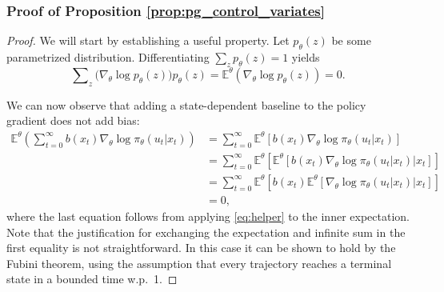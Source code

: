 \subsubsection{Proof of Proposition \ref{prop:pg_control_variates}}
\begin{proof}
We will start by establishing a useful property. 
Let $p_\theta(z)$ be some parametrized distribution. Differentiating $\sum\nolimits_{z } {{p_\theta }(z)}  = 1$  yields
\begin{equation}\label{eq:helper}
\sum\nolimits_{z} {(\nabla_\theta \log {p_\theta }({z})} ){p_\theta }({z}) = {\mathbb E^\theta }(\nabla_\theta  \log {p_\theta }({z})) = 0.
\end{equation}

We can now observe that adding a state-dependent baseline to the policy gradient does not add bias:
\begin{equation*}
\begin{split}
{\mathbb E^\theta }\left( \sum_{t=0}^\infty b(x_t) {{\nabla _\theta }\log {\pi _\theta }({u_t}|{x_t})} \right) &= \sum_{t=0}^\infty {\mathbb E^\theta }\left[ b(x_t) {{\nabla _\theta }\log {\pi _\theta }({u_t}|{x_t})} \right] \\ 
&= \sum_{t=0}^\infty {\mathbb E^\theta }\left[ {\mathbb E^\theta }\left[ \left. b(x_t) {{\nabla _\theta }\log {\pi _\theta }({u_t}|{x_t})} \right| x_t \right]\right] \\ 
&= \sum_{t=0}^\infty {\mathbb E^\theta }\left[ b(x_t) {\mathbb E^\theta }\left[ \left. {{\nabla _\theta }\log {\pi _\theta }({u_t}|{x_t})} \right| x_t \right]\right] \\ 
&= 0,
\end{split}
\end{equation*}
where the last equation follows from applying \eqref{eq:helper} to the inner expectation. Note that the justification for exchanging the expectation and infinite sum in the first equality is not straightforward. In this case it can be shown to hold by the Fubini theorem, using the assumption that every trajectory reaches a terminal state in a bounded time w.p.~1.


\end{proof}
